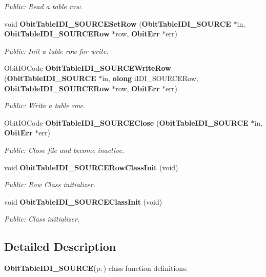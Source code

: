 \begin{CompactItemize}
\begin{CompactList}\small\item\em Public: Read a table row. \item\end{CompactList}\item 
void {\bf Obit\-Table\-IDI\_\-SOURCESet\-Row} ({\bf Obit\-Table\-IDI\_\-SOURCE} $\ast$in, {\bf Obit\-Table\-IDI\_\-SOURCERow} $\ast$row, {\bf Obit\-Err} $\ast$err)
\begin{CompactList}\small\item\em Public: Init a table row for write. \item\end{CompactList}\item 
Obit\-IOCode {\bf Obit\-Table\-IDI\_\-SOURCEWrite\-Row} ({\bf Obit\-Table\-IDI\_\-SOURCE} $\ast$in, {\bf olong} i\-IDI\_\-SOURCERow, {\bf Obit\-Table\-IDI\_\-SOURCERow} $\ast$row, {\bf Obit\-Err} $\ast$err)
\begin{CompactList}\small\item\em Public: Write a table row. \item\end{CompactList}\item 
Obit\-IOCode {\bf Obit\-Table\-IDI\_\-SOURCEClose} ({\bf Obit\-Table\-IDI\_\-SOURCE} $\ast$in, {\bf Obit\-Err} $\ast$err)
\begin{CompactList}\small\item\em Public: Close file and become inactive. \item\end{CompactList}\item 
void {\bf Obit\-Table\-IDI\_\-SOURCERow\-Class\-Init} (void)
\begin{CompactList}\small\item\em Public: Row Class initializer. \item\end{CompactList}\item 
void {\bf Obit\-Table\-IDI\_\-SOURCEClass\-Init} (void)
\begin{CompactList}\small\item\em Public: Class initializer. \item\end{CompactList}\end{CompactItemize}


\subsection{Detailed Description}
{\bf Obit\-Table\-IDI\_\-SOURCE}{\rm (p.\,\pageref{structObitTableIDI__SOURCE})} class function definitions. 


